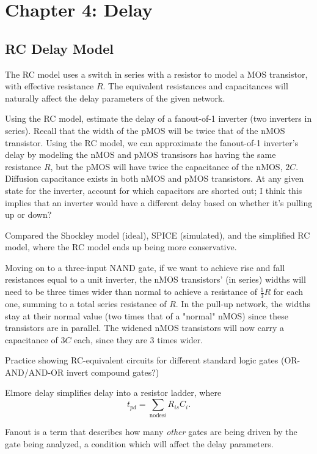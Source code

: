 \documentclass{article}
\begin{document}
\setcounter{section}{3}
\section{Chapter 4: Delay} 
\setcounter{subsection}{2}
\subsection{RC Delay Model}
The RC model uses a switch in series with a resistor to model a MOS transistor, with effective resistance \(R\). The equivalent resistances and capacitances will naturally affect the delay parameters of the given network.

Using the RC model, estimate the delay of a fanout-of-1 inverter (two inverters in series). Recall that the width of the pMOS will be twice that of the nMOS transistor. Using the RC model, we can approximate the fanout-of-1 inverter's delay by modeling the nMOS and pMOS transisors has having the same resistance \(R\), but the pMOS will have twice the capacitance of the nMOS, \(2C\). Diffusion capacitance exists in both nMOS and pMOS transistors. At any given state for the inverter, account for which capacitors are shorted out; I think this implies that an inverter would have a different delay based on whether it's pulling up or down? 

Compared the Shockley model (ideal), SPICE (simulated), and the simplified RC model, where the RC model ends up being more conservative.

Moving on to a three-input NAND gate, if we want to achieve rise and fall resistances equal to a unit inverter, the nMOS transistors' (in series) widths will need to be three times wider than normal to achieve a resistance of \(\frac{1}{3}R\) for each one, summing to a total series resistance of \(R\). In the pull-up network, the widths stay at their normal value (two times that of a "normal" nMOS) since these transistors are in parallel. The widened nMOS transistors will now carry a capacitance of \(3C\) each, since they are 3 times wider.

Practice showing RC-equivalent circuits for different standard logic gates (OR-AND/AND-OR invert compound gates?)

Elmore delay simplifies delay into a resistor ladder, where \[
	t_{pd} = \sum_{\mathrm{nodes} i} R_{is}C_{i}.
\]

Fanout is a term that describes how many \textit{other} gates are being driven by the gate being analyzed, a condition which will affect the delay parameters.
\end{document}
